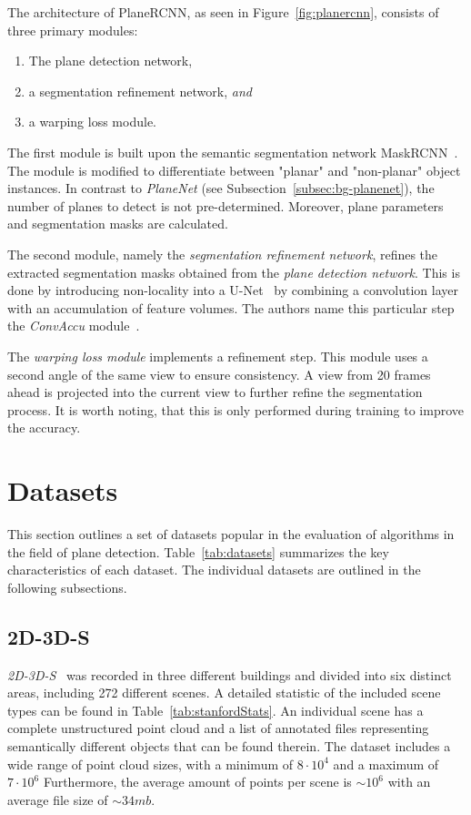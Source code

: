 \documentclass[main.tex]{subfiles}
\begin{document}
The architecture of PlaneRCNN, as seen in Figure~\ref{fig:planercnn}, consists of three primary modules:
\begin{enumerate}
    \item The plane detection network,
    \item a segmentation refinement network, \textit{and}
    \item a warping loss module.
\end{enumerate}
The first module is built upon the semantic segmentation network MaskRCNN~\cite{he2017mask}. The module is modified to differentiate between "planar" and "non-planar"
object instances. In contrast to \textit{PlaneNet} (see Subsection~\ref{subsec:bg-planenet}), the number of planes to detect is not pre-determined. Moreover,
plane parameters and segmentation masks are calculated.

The second module, namely the \textit{segmentation refinement network}, refines the extracted segmentation masks obtained from the \textit{plane detection network}.
This is done by introducing non-locality into a U-Net~\cite{ronneberger2015u} by combining a convolution layer with an accumulation of feature volumes. The authors name this
particular step the \textit{ConvAccu} module~\cite[Section~3.2]{Liu_Kim_Gu_Furukawa_Kautz_2019}.

The \textit{warping loss module} implements a refinement step.  This module uses a second angle of the same view to ensure consistency. A view from 20 frames ahead is
projected into the current view to further refine the segmentation process. It is worth noting, that this is only performed during training to improve the accuracy.

\section{Datasets}
This section outlines a set of datasets popular in the evaluation of algorithms
in the field of plane detection. Table~\ref{tab:datasets} summarizes the key characteristics of each
dataset. The individual datasets are outlined in the following subsections.

\subsection{2D-3D-S}
\label{subsec:bg-stanford}
\textit{2D-3D-S}~\cite{2017arXiv170201105A} was recorded in three different buildings and divided into six distinct areas, including 272 different scenes. A detailed statistic of the included scene types can be found in Table~\ref{tab:stanfordStats}.
An individual scene has a complete unstructured point cloud and a list of annotated files representing semantically different objects that can be found therein.
The dataset includes a wide range of point cloud sizes, with a minimum of $8\cdot 10^4$ and a maximum of $7\cdot 10^6$
Furthermore, the average amount of points per scene is ${\sim}10^6$ with an average file size of ${\sim}34mb$.
\end{document}
